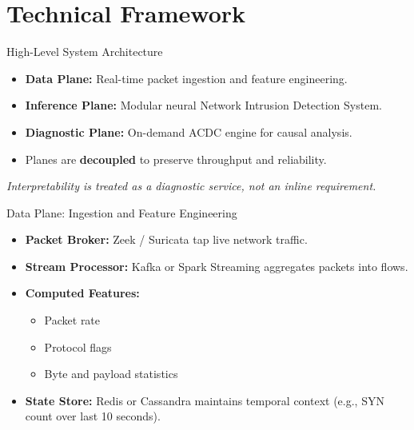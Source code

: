 \documentclass{beamer}
\begin{document}
	\section{Technical Framework}
	
	\begin{frame}{High-Level System Architecture}
		\begin{itemize}
			\item \textbf{Data Plane:} Real-time packet ingestion and feature engineering.
			\item \textbf{Inference Plane:} Modular neural Network Intrusion Detection System.
			\item \textbf{Diagnostic Plane:} On-demand ACDC engine for causal analysis.
			\item \justifying Planes are \textbf{decoupled} to preserve throughput and reliability.
		\end{itemize}
		\vspace{0.3cm}
		\centering
		\textit{Interpretability is treated as a diagnostic service, not an inline requirement.} \tiny \cite{ahmed2021explainable}
		
	\end{frame}
	
	\begin{frame}{Data Plane: Ingestion and Feature Engineering}
		\begin{itemize}
			\item \textbf{Packet Broker:} Zeek / Suricata tap live network traffic.
			\item \textbf{Stream Processor:} Kafka or Spark Streaming aggregates packets into flows.
			\item \textbf{Computed Features:}
			\begin{itemize}
				\item Packet rate
				\item Protocol flags
				\item Byte and payload statistics
			\end{itemize}
			\item \textbf{State Store:} Redis or Cassandra maintains temporal context
			(e.g., SYN count over last 10 seconds).
		\end{itemize}
	\end{frame}
	
\end{document}
